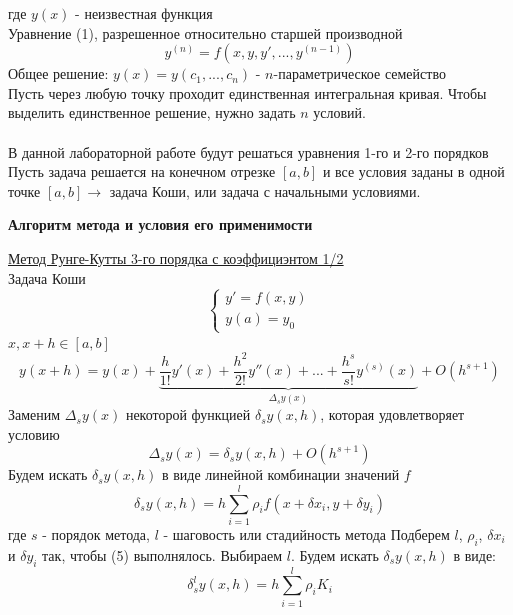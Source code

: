 \documentclass{article}
\begin{document}
	где $y(x)$ - неизвестная функция\\
	Уравнение (1), разрешенное относительно старшей производной
	\begin{equation}
		y^{(n)} = f(x, y, y', ..., y^{(n-1)})
	\end{equation}
	Общее решение: $y(x) = y(c_1, ..., c_n)$ - $n$-параметрическое семейство\\
	Пусть через любую точку проходит единственная интегральная кривая. Чтобы выделить единственное решение, нужно задать $n$ условий.\\
	\\
	В данной лабораторной работе будут решаться уравнения 1-го и 2-го порядков\\
	Пусть задача решается на конечном отрезке $[a,b]$ и все условия заданы в одной точке $[a,b] \rightarrow$ задача Коши, или задача с начальными условиями.
	\begin{center} \textbf{Алгоритм метода и условия его применимости}\end{center}
	\underline{Метод Рунге-Кутты 3-го порядка с коэффициэнтом 1/2}\\
	Задача Коши
	\begin{equation}
		\begin{cases}
			y' = f(x, y)\\
			y(a) = y_0
		\end{cases}	
	\end{equation}
	$x, x+h \in [a, b]$
	\begin{equation}
		y(x+h) = y(x) + \underbrace{\frac{h}{1!} y'(x) + \frac{h^2}{2!} y''(x) + ... + \frac{h^s}{s!} y^{(s)}(x)}_{\Delta_sy(x)} + O(h^{s+1})
	\end{equation}
	Заменим $\Delta_sy(x)$ некоторой функцией $\delta_sy(x,h)$, которая удовлетворяет условию
	\begin{equation}
		\Delta_sy(x) = \delta_sy(x,h) + O(h^{s+1}) 
	\end{equation}
	Будем искать $\delta_sy(x,h)$ в виде линейной комбинации значений $f$
	\begin{equation}
		\displaystyle \delta_sy(x,h) = h\sum_{i=1}^{l}\rho_if(x + \delta x_i, y + \delta y_i) 
	\end{equation}
	где $s$ - порядок метода, $l$ - шаговость или стадийность метода
	Подберем $l$, $\rho_i$, $\delta x_i$ и $\delta y_i$ так, чтобы (5) выполнялось.
	Выбираем $l$. Будем искать $\delta_sy(x,h)$ в виде:
	\begin{equation}
		\displaystyle \delta^l_sy(x,h) = h\sum_{i=1}^{l}\rho_iK_i
	\end{equation}
\end{document}
